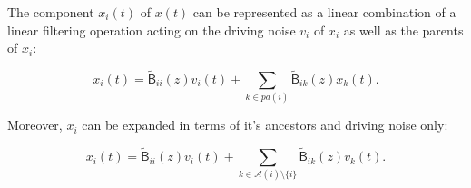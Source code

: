 \documentclass[12pt]{article}
\def\B{\mathsf{B}}  %
\def\wtB{\widetilde{\B}}  %
\newcommand{\pa}[1]{pa(#1)}  %
\newcommand{\anc}[1]{\mathcal{A}(#1)}  %
\begin{document}
\begin{proposition}
  \label{prop:parent_expanding}
  The component $x_i(t)$ of $x(t)$ can be represented as a linear
  combination of a linear filtering operation acting on the driving
  noise $v_i$ of $x_i$ as well as the parents of $x_i$:

  \begin{equation}
    \label{eqn:parent_expansion}
    x_i(t) = \wtB_{ii}(z)v_i(t) + \sum_{k \in \pa{i}}\wtB_{ik}(z)x_k(t).
  \end{equation}

  Moreover, $x_i$ can be expanded in terms of it's ancestors and
  driving noise only:

  \begin{equation}
    x_i(t) = \wtB_{ii}(z)v_i(t) + \sum_{k \in \anc{i} \setminus\{i\}}\wtB_{ik}(z)v_k(t).
  \end{equation}
\end{proposition}
\end{document}
